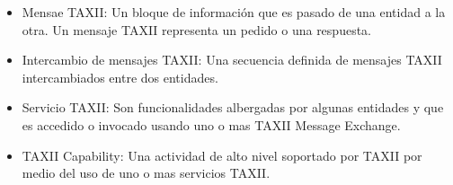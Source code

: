 \begin{itemize}
 \item Mensae TAXII: Un bloque de información que es pasado de una entidad a la 
 otra. Un mensaje TAXII representa un pedido o una respuesta.
 \item Intercambio de mensajes TAXII: Una secuencia definida de mensajes TAXII 
 intercambiados entre dos entidades.
\item Servicio TAXII: Son funcionalidades albergadas por algunas entidades y que 
es accedido o invocado usando uno o mas TAXII Message Exchange.
\item TAXII Capability: Una actividad de alto nivel soportado por TAXII por 
medio del uso de uno o mas servicios TAXII.
\end{itemize}




